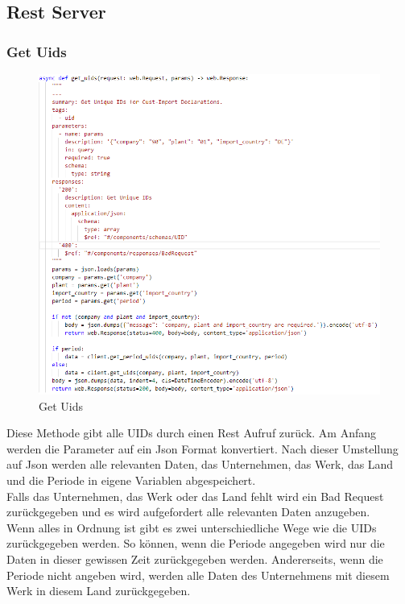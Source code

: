 \subsection{Rest Server}
\subsubsection{Get Uids}
\begin{figure}[H]
\centering  
\includegraphics[scale=0.55]{images/GetUids.PNG}
  \caption[Get Uids]{Get Uids}
  \label{fig:Get-Uids}
\end{figure}
Diese Methode gibt alle UIDs durch einen Rest Aufruf zurück. Am Anfang werden die Parameter auf ein Json Format konvertiert. Nach dieser Umstellung auf Json werden alle relevanten Daten, das Unternehmen, das Werk, das Land und die Periode in eigene Variablen abgespeichert.\\


Falls das Unternehmen, das Werk oder das Land fehlt wird ein Bad Request zurückgegeben und es wird aufgefordert alle relevanten Daten anzugeben.\\

Wenn alles in Ordnung ist gibt es zwei unterschiedliche Wege wie die UIDs zurückgegeben werden. So können, wenn die Periode angegeben wird nur die Daten in dieser gewissen Zeit zurückgegeben werden. Andererseits, wenn die Periode nicht angeben wird, werden alle Daten des Unternehmens mit diesem Werk in diesem Land zurückgegeben.
